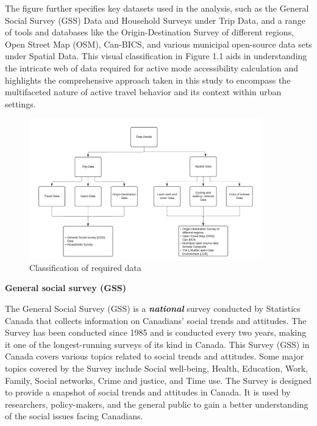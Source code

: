 \documentclass[
11pt, %
oneside, %
english, %
singlespacing, %
]{macthesis} %
\begin{document}
The figure further specifies key datasets used in the analysis, such as the General Social Survey (GSS) Data and Household Surveys under Trip Data, and a range of tools and databases like the Origin-Destination Survey of different regions, Open Street Map (OSM), Can-BICS, and various municipal open-source data sets under Spatial Data. This visual classification in Figure 1.1 aids in understanding the intricate web of data required for active mode accessibility calculation and highlights the comprehensive approach taken in this study to encompass the multifaceted nature of active travel behavior and its context within urban settings.

\begin{figure}
\centering
\includegraphics[width=0.9\textwidth,height=0.6\textheight]{figure/ch02-Fig-01.jpg}
\caption{Classification of required data}
\end{figure}

\textbf{General social survey (GSS)}

The General Social Survey (GSS) is a \textbf{\emph{national}} survey conducted by Statistics Canada that collects information on Canadians' social trends and attitudes. The Survey has been conducted since 1985 and is conducted every two years, making it one of the longest-running surveys of its kind in Canada. This Survey (GSS) in Canada covers various topics related to social trends and attitudes. Some major topics covered by the Survey include Social well-being, Health, Education, Work, Family, Social networks, Crime and justice, and Time use. The Survey is designed to provide a snapshot of social trends and attitudes in Canada. It is used by researchers, policy-makers, and the general public to gain a better understanding of the social issues facing Canadians.
\end{document}
